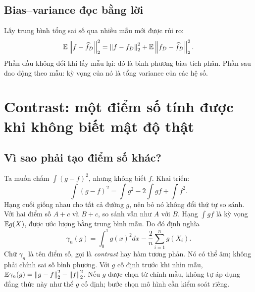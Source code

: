 \subsection{Bias--variance đọc bằng lời}
Lấy trung bình tổng sai số qua nhiều mẫu mới được rủi ro:
\[
\mathbb E\left\lVert f-\widehat f_D\right\rVert_2^2
=\left\lVert f-f_D\right\rVert_2^2+\mathbb E\left\lVert f_D-\widehat f_D\right\rVert_2^2.
\]
Phần đầu không đổi khi lấy mẫu lại: đó là bình phương bias tích phân.
Phần sau dao động theo mẫu: kỳ vọng của nó là tổng variance của các hệ số.

\section{Contrast: một điểm số tính được khi không biết mật độ thật}
\subsection{Vì sao phải tạo điểm số khác?}
Ta muốn chấm $\int(g-f)^2$, nhưng không biết $f$.
Khai triển:
\[
\int(g-f)^2=\int g^2-2\int gf+\int f^2.
\]
Hạng cuối giống nhau cho tất cả đường $g$, nên bỏ nó không đổi thứ tự
so sánh. Với hai điểm số $A+c$ và $B+c$, so sánh vẫn như $A$ với $B$.
Hạng $\int gf$ là kỳ vọng $\mathbb E g(X)$, được ước lượng bằng trung bình mẫu.
Do đó định nghĩa
\[
\boxed{\gamma_n(g)=\int_0^1g(x)^2dx-
\frac2n\sum_{i=1}^ng(X_i).}
\]
Chữ $\gamma_n$ là tên điểm số, gọi là \emph{contrast} hay hàm tương phản.
Nó có thể âm; không phải chính sai số bình phương.
Với $g$ cố định trước khi nhìn mẫu,
$\mathbb E\gamma_n(g)=\left\lVert g-f\right\rVert_2^2-\left\lVert f\right\rVert_2^2$.
Nếu $g$ được chọn từ chính mẫu, không tự áp dụng đẳng thức này như thể
$g$ cố định; bước chọn mô hình cần kiểm soát riêng.

